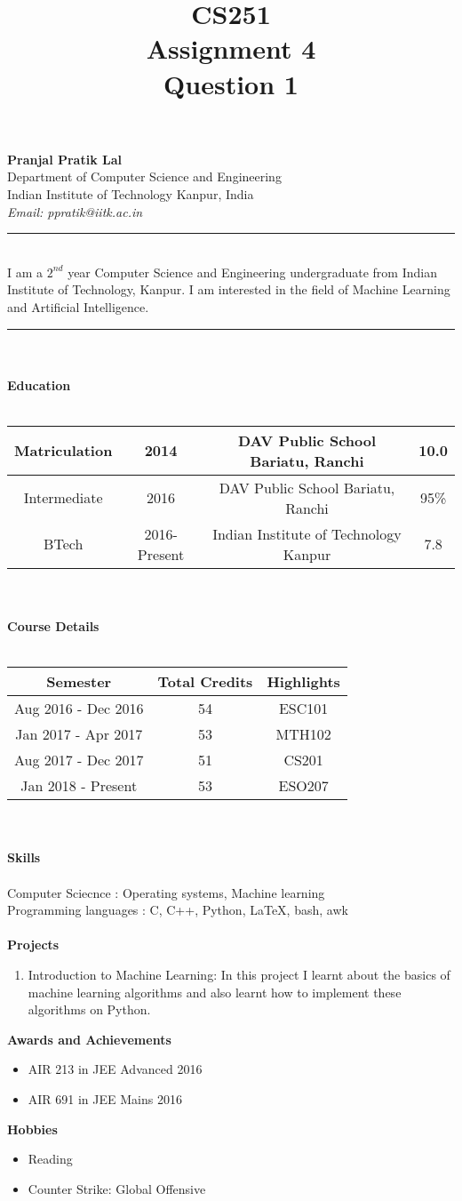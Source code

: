 \documentclass{article}
\title{CS251\\Assignment 4\\Question 1}
\newcommand{\doublerule}[1][.4pt]{%
  \noindent
  \makebox[0pt][l]{\rule[.7ex]{\linewidth}{#1}}%
  \rule[.3ex]{\linewidth}{#1}}
\begin{document}
\noindent\textbf{Pranjal Pratik Lal}\\
Department of Computer Science and Engineering\\
Indian Institute of Technology Kanpur, India\\
\textit{Email: ppratik@iitk.ac.in}\\
\doublerule\\
I am a $2^{nd}$ year Computer Science and Engineering undergraduate from Indian Institute of Technology, Kanpur. I am interested in the field of Machine Learning and Artificial Intelligence.
\\
\doublerule\\
\\
\textbf{Education}\\
\\
\begin{tabular}{|c|c|c|c|}
\hline
Matriculation & 2014 & DAV Public School Bariatu, Ranchi & 10.0\\
\hline
Intermediate & 2016 & DAV Public School Bariatu, Ranchi & 95\%\\
\hline
BTech & 2016-Present & Indian Institute of Technology Kanpur &7.8\\
\hline
\end{tabular}\\
\\
\textbf{Course Details}\\
\\
\begin{tabular}{|c|c|c|}
\hline
\textbf{Semester} & \textbf{Total Credits} & \textbf{Highlights}\\
\hline
Aug 2016 - Dec 2016 & 54 & ESC101\\
\hline
Jan 2017 - Apr 2017 & 53 & MTH102\\
\hline
Aug 2017 - Dec 2017 & 51 & CS201\\
\hline
Jan 2018 - Present & 53 & ESO207\\
\hline
\end{tabular}\\
\\
\textbf{Skills}\\
\\
Computer Sciecnce : Operating systems, Machine learning\\
Programming languages : C, C++, Python, \LaTeX, bash, awk\\
\\
\textbf{Projects}\\
\begin{enumerate}
\itemsep0em
\item Introduction to Machine Learning: In this project I learnt about the basics of machine learning algorithms and also learnt how to implement these algorithms on Python.
\end{enumerate}
\textbf{Awards and Achievements}\\
\renewcommand{\labelitemi}{$\textendash$}
\begin{itemize}
\itemsep0em
\item AIR 213 in JEE Advanced 2016
\item AIR 691 in JEE Mains 2016
\end{itemize}
\textbf{Hobbies}
\begin{itemize}
\itemsep0em
\item Reading
\item Counter Strike: Global Offensive
\end{itemize}
\end{document}
